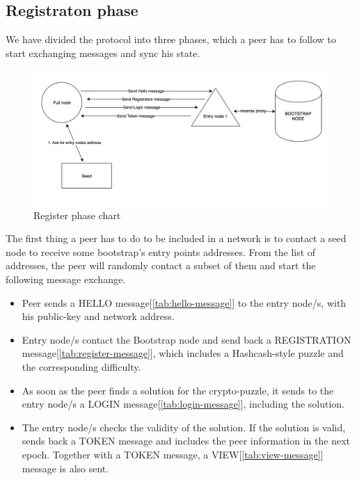 \documentclass[mscthesis]{usiinfthesis}
\begin{document}
\subsection{Registraton phase}
We have divided the protocol into three phases, which a peer has to follow to start exchanging messages and sync his state. 

\begin{figure}[h]
  \includegraphics[width=\linewidth]{images/register-phase.png}
  \caption{Register phase chart}
  \label{fig:register-flow}
\end{figure}

The first thing a peer has to do to be included in a network is to contact a seed node to receive some bootstrap's entry points addresses. From the list of addresses, the peer will randomly contact a subset of them and start the following message exchange.
\begin{itemize}
	\item Peer sends a HELLO message[\ref{tab:hello-message}] to the entry node/s, with his public-key and network address.
	\item Entry node/s contact the Bootstrap node and send back a REGISTRATION message[\ref{tab:register-message}], which includes a Hashcash-style puzzle and the corresponding difficulty.
	\item As soon as the peer finds a solution for the crypto-puzzle, it sends to the entry node/s a LOGIN message[\ref{tab:login-message}], including the solution.
	\item The entry node/s checks the validity of the solution. If the solution is valid, sends back a TOKEN message and includes the peer information in the next epoch. Together with a TOKEN message, a VIEW[\ref{tab:view-message}] message is also sent.
\end{itemize}
  
\end{document}
